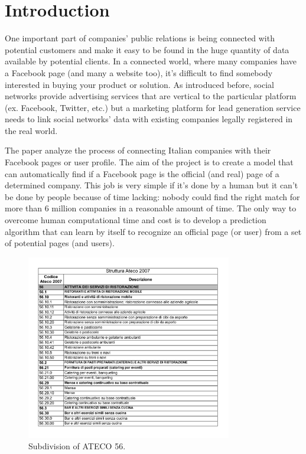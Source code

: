 \chapter{Introduction} %
One important part of companies' public relations is being connected with potential customers and make it easy to be found in the huge quantity of data available by potential clients. In a connected world, where many companies have a Facebook page (and many a website too), it's difficult to find somebody interested in buying your product or solution. As introduced before, social networks provide advertising services that are vertical to the particular platform (ex. Facebook, Twitter, etc.) but a marketing platform for lead generation service needs to link social networks' data with existing companies legally registered in the real world.

The paper analyze the process of connecting Italian companies with their Facebook pages or user profile.
The aim of the project is to create a model that can automatically find if a Facebook page is the official (and real) page of a determined company. This job is very simple if it's done by a human but it can't be done by people because of time lacking: nobody could find the right match for more than 6 million companies in a reasonable amount of time. The only way to overcome human computational time and cost is to develop a prediction algorithm that can learn by itself to recognize an official page (or user) from a set of potential pages (and users).

\begin{figure}
\centering
\includegraphics[width=0.8\textwidth]{img/ateco_tab.jpg}
\caption{Subdivision of ATECO 56.}
\label{Fig.1}
\end{figure}

